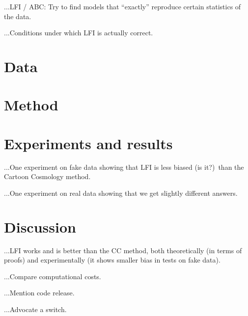 \documentclass[12pt]{article}
\begin{document}
...LFI / ABC:  Try to find models that ``exactly'' reproduce certain statistics of the data.

...Conditions under which LFI is actually correct.

\section{Data}

\section{Method}

\section{Experiments and results}

...One experiment on fake data showing that LFI is less biased (is it?)\ than the Cartoon Cosmology method.

...One experiment on real data showing that we get slightly different answers.

\section{Discussion}

...LFI works and is better than the CC method, both theoretically (in terms of proofs) and experimentally (it shows smaller bias in tests on fake data).

...Compare computational costs.

...Mention code release.

...Advocate a switch.
\end{document}
